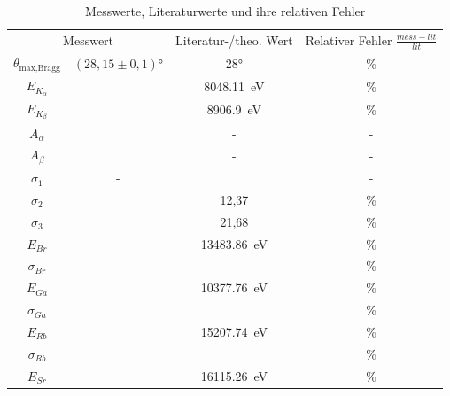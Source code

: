 \begin{table}[H]
\centering
\caption{Messwerte, Literaturwerte und ihre relativen Fehler}
\begin{tabular}{c c c c}
    \toprule
    \multicolumn{2}{c}{Messwert} &\multicolumn{1}{c}{Literatur-/theo. Wert}  &\multicolumn{1}{c}{Relativer Fehler $\frac{mess-lit}{lit} $}  \\
    \cmidrule(lr){1-4} 
       $\theta _{\text{max,Bragg}}$ & $(28,15\pm 0,1)°$  & 28° & \text{}\% \\
       $E_{K_{\alpha}} $ & \text{} & \SI{8048.11}{\electronvolt} \cite{NIST} & \text{}\% \\
       $E_{K_{\beta}}$ & \text{} & \SI{8906.9}{\electronvolt}\cite{NIST} & \text{}\%  \\
       $A_{\alpha} $ & \text{} & - & - \\
       $A_{\beta} $ & \text{} & - & - \\
       $\sigma _1 $ & - & \text{} & - \\
       $\sigma _2 $ & \text{} & 12,37 & \text{} \% \\
       $\sigma _3 $ & \text{} & 21,68 & \text{}\% \\
       $E_{Br} $ & \text{} & \SI{13483.86}{\electronvolt}\cite{NIST} & \text{}\%  \\
       $\sigma _{Br} $ & \text{} & \text{} & \text{}\% \\
       $E_{Ga}$ & \text{} & \SI{10377.76}{\electronvolt}\cite{NIST} & \text{}\% \\
       $\sigma _{Ga} $ & \text{} & \text{} & \text{}\% \\
       $E_{Rb}$ & \text{} & \SI{15207.74}{\electronvolt}\cite{NIST} & \text{} \%\\
       $\sigma _{Rb} $ & \text{} & \text{} & \text{} \%\\
       $E_{Sr}$ & \text{} & \SI{16115.26}{\electronvolt}\cite{NIST} & \text{}\% \\

\end{tabular}
\end{table}

